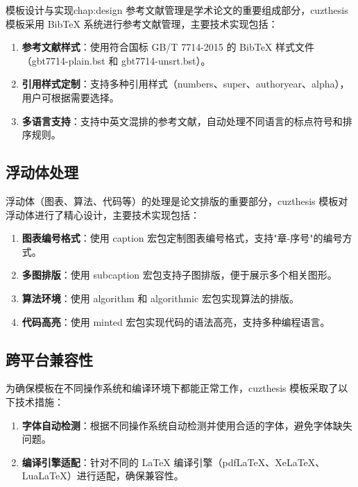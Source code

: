 \begin{cuzchapter}{模板设计与实现}{chap:design}
	参考文献管理是学术论文的重要组成部分，cuzthesis 模板采用 BibTeX 系统进行参考文献管理，主要技术实现包括：
	
	\begin{enumerate}
		\item \textbf{参考文献样式}：使用符合国标 GB/T 7714-2015 的 BibTeX 样式文件（gbt7714-plain.bst 和 gbt7714-unsrt.bst）。
		
		\item \textbf{引用样式定制}：支持多种引用样式（numbers、super、authoryear、alpha），用户可根据需要选择。
		
		\item \textbf{多语言支持}：支持中英文混排的参考文献，自动处理不同语言的标点符号和排序规则。
	\end{enumerate}
	
	\subsection{浮动体处理}
	
	浮动体（图表、算法、代码等）的处理是论文排版的重要部分，cuzthesis 模板对浮动体进行了精心设计，主要技术实现包括：
	
	\begin{enumerate}
		\item \textbf{图表编号格式}：使用 caption 宏包定制图表编号格式，支持"章-序号"的编号方式。
		
		\item \textbf{多图排版}：使用 subcaption 宏包支持子图排版，便于展示多个相关图形。
		
		\item \textbf{算法环境}：使用 algorithm 和 algorithmic 宏包实现算法的排版。
		
		\item \textbf{代码高亮}：使用 minted 宏包实现代码的语法高亮，支持多种编程语言。
	\end{enumerate}
	
	\subsection{跨平台兼容性}
	
	为确保模板在不同操作系统和编译环境下都能正常工作，cuzthesis 模板采取了以下技术措施：
	
	\begin{enumerate}
		\item \textbf{字体自动检测}：根据不同操作系统自动检测并使用合适的字体，避免字体缺失问题。
		
		\item \textbf{编译引擎适配}：针对不同的 LaTeX 编译引擎（pdfLaTeX、XeLaTeX、LuaLaTeX）进行适配，确保兼容性。
		

\end{enumerate}
\end{cuzchapter}
